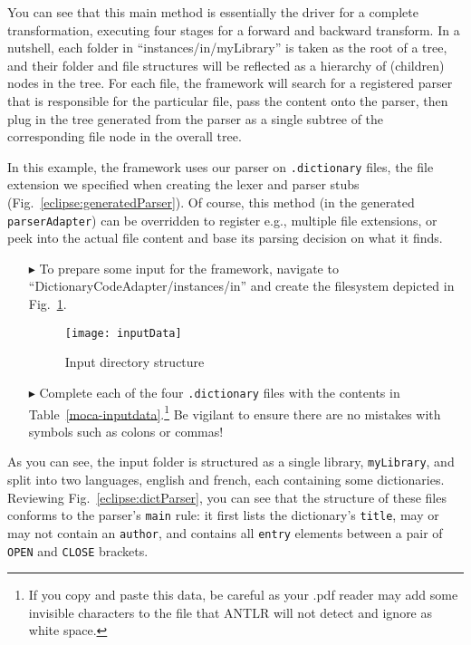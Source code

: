 You can see that this main method is essentially the driver for a complete transformation, executing four stages for a forward and backward transform. In a
nutshell, each folder in ``instances/in/myLibrary'' is taken as the root of a tree, and their folder and file structures will be reflected as a hierarchy of
(children) nodes in the tree. For each file, the framework will search for a registered parser that is responsible for the particular file, pass the content
onto the parser, then plug in the tree generated from the parser as a single subtree of the corresponding file node in the overall tree.

In this example, the framework uses our parser on \texttt{.dictionary} files, the file extension we specified when creating the lexer and parser stubs
(Fig.~\ref{eclipse:generatedParser}). Of course, this method (in the generated \texttt{parserAdapter}) can be overridden to register e.g., multiple
file extensions, or peek into the actual file content and base its parsing decision on what it finds.

\begin{itemize}

\item[$\blacktriangleright$] To prepare some input for the framework, navigate to ``Dict\-ion\-ar\-y\-Code\-Adap\-ter\-/in\-stan\-ces\-/in'' and create the
filesystem depicted in \\ Fig.~\ref{eclipse:textDirectory}. 

\begin{figure}[htp]
\begin{center}
  \texttt{[image: inputData]}
  \caption{Input directory structure}
  \label{eclipse:textDirectory}
\end{center}
\end{figure}

\item[$\blacktriangleright$] Complete each of the four \texttt{.dictionary} files with the contents in Table~\ref{moca-inputdata}.\footnote{If you copy and
paste this data, be careful as your .pdf reader may add some invisible characters to the file that ANTLR will not detect and ignore as white space.} 
Be vigilant to ensure there are no mistakes with symbols such as colons or commas!

\end{itemize}

As you can see, the input folder is structured as a single library, \texttt{myLibrary}, and split into two languages, english and french, each containing
some dictionaries. Reviewing Fig.~\ref{eclipse:dictParser}, you can see that the structure of these files conforms to the parser's \texttt{main} rule: it
first lists the dictionary's \texttt{title}, may or may not contain an \texttt{author}, and contains all \texttt{entry} elements between a pair of \texttt{OPEN}
and \texttt{CLOSE} brackets.

